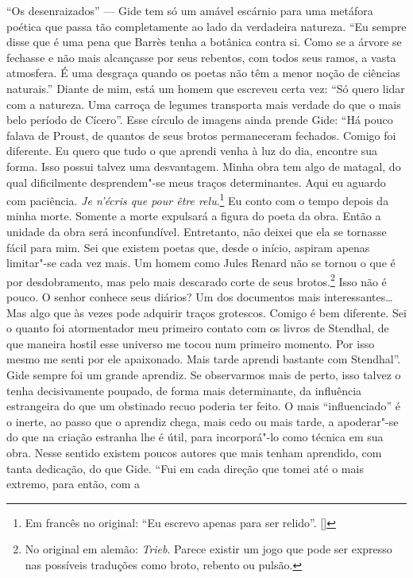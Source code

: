 ``Os desenraizados'' --- Gide tem só um amável escárnio para uma metáfora
poética que passa tão completamente ao lado da verdadeira natureza. ``Eu
sempre disse que é uma pena que Barrès tenha a botânica contra si. Como
se a árvore se fechasse e não mais alcançasse por seus rebentos, com
todos seus ramos, a vasta atmosfera. É uma desgraça quando os poetas não
têm a menor noção de ciências naturais.'' Diante de mim, está um homem
que escreveu certa vez: ``Só quero lidar com a natureza. Uma carroça
de legumes transporta mais verdade do que o mais belo período de
Cícero''. Esse círculo de imagens ainda prende Gide: ``Há pouco falava
de Proust, de quantos de seus brotos permaneceram fechados. Comigo foi
diferente. Eu quero que tudo o que aprendi venha à luz do dia, encontre
sua forma. Isso possui talvez uma desvantagem. Minha obra tem algo de
matagal, do qual dificilmente desprendem"-se meus traços determinantes.
Aqui eu aguardo com paciência. \emph{Je n'écris que pour être
relu}.\footnote{Em francês no original: ``Eu escrevo apenas para
  ser relido''. []} Eu conto com o tempo depois da minha morte. Somente
a morte expulsará a figura do poeta da obra. Então a unidade da obra
será inconfundível. Entretanto, não deixei que ela se tornasse fácil
para mim. Sei que existem poetas que, desde o início, aspiram apenas
limitar"-se cada vez mais. Um homem como Jules Renard não se tornou o que
é por desdobramento, mas pelo mais descarado corte de seus
brotos.\footnote{No original em alemão: \emph{Trieb}. Parece existir um jogo
  que pode ser expresso nas possíveis traduções como broto, rebento ou
  pulsão. \versal{[N.~T.]}} Isso não é pouco. O senhor conhece seus diários? Um dos
documentos mais interessantes\ldots{} Mas algo que às vezes pode adquirir
traços grotescos. Comigo é bem diferente. Sei o quanto foi
atormentador meu primeiro contato com os livros de Stendhal, de que maneira
hostil esse universo me tocou num primeiro momento. Por isso mesmo me
senti por ele apaixonado. Mais tarde aprendi bastante com Stendhal''.
Gide sempre foi um grande aprendiz. Se observarmos mais de perto, isso
talvez o tenha decisivamente poupado, de forma mais determinante, da
influência estrangeira do que um obstinado recuo poderia ter feito. O
mais ``influenciado'' é o inerte, ao passo que o aprendiz chega, mais
cedo ou mais tarde, a apoderar"-se do que na criação estranha lhe é útil,
para incorporá"-lo como técnica em sua obra. Nesse sentido existem poucos
autores que mais tenham aprendido, com tanta dedicação, do que Gide.
``Fui em cada direção que tomei até o mais extremo, para então, com a
